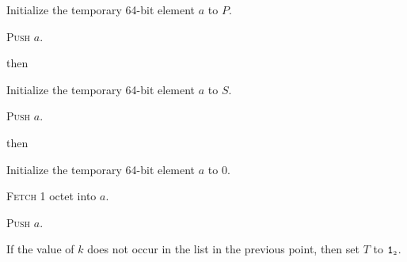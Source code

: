 \documentclass[a4paper,12pt]{article}
\newcommand{\num}[1]{\texttt{#1}}
\newcommand{\hex}[1]{\num{#1}_{\textup{\tiny 16}}}
\newcommand{\bin}[1]{\num{#1}_{\textup{\tiny 2}}}
\newcommand{\PC}{P}
\newcommand{\SP}{S}
\newcommand{\TERM}{T}
\newcommand{\T}{\bin{1}}
\newcommand{\proc}[1]{\textsc{#1}}
\newcommand{\op}[1]{$#1$}
\theoremstyle{definition}
\newcommand{\GETSP}     [1]{\op{\hex{06}}}
\newcommand{\PUSHB}     [1]{\op{\hex{08}}}
\begin{document}
\begin{stepnumbers}
\begin{description}
    \begin{stepnumbers}
    \item Initialize the temporary 64-bit element $a$ to $\PC$.
    \item \proc{Push} $a$.
    \end{stepnumbers}
  \item[\GETSP{}] then
    \begin{stepnumbers}
    \item Initialize the temporary 64-bit element $a$ to $\SP$.
    \item \proc{Push} $a$.
    \end{stepnumbers}
  \item[\PUSHB{}] then
    \begin{stepnumbers}
    \item Initialize the temporary 64-bit element $a$ to 0.
    \item \proc{Fetch} 1 octet into $a$.
    \item \proc{Push} $a$.
    \end{stepnumbers}
  \end{description}
\item If the value of $k$ does not occur in the list in the previous point, then set $\TERM$ to $\T$.
\end{stepnumbers}
\end{document}

